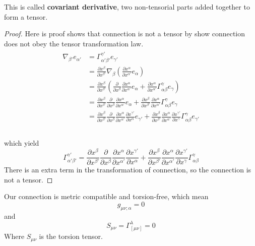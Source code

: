 \documentclass[12pt]{article}
\theoremstyle{mystyle}{\newtheorem{definition}{Definition}[subsection]}
\theoremstyle{mystyle}{\newtheorem{theorem}[definition]{Theorem}}
\theoremstyle{mystyle}{\newtheorem*{remark}{Remark}}
\theoremstyle{mystyle}{\newtheorem{example}{Example}[subsection]}
\theoremstyle{mystyle}{\newtheorem{examples}{Examples}[subsection]}
\theoremstyle{mystyle}{\newtheorem{cthm}{}[subsection]}
\begin{document}
This is called \textbf{covariant derivative}, two non-tensorial parts added together to form a tensor.

\begin{proof}
  Here is proof shows that connection is not a tensor by show connection does not obey the tensor transformation law.
  \begin{align*}
    \begin{split}
      \nabla_{\beta'}e_{\alpha'} & = \Gamma^{\gamma'}_{\alpha'\beta'}e_{\gamma'} \\
      &= \frac{\partial x^{\beta}}{\partial x^{\beta'}}\nabla_{\beta}(\frac{\partial x^{\alpha}}{\partial x^{\alpha'}}e_{\alpha})\\
      &= \frac{\partial x^{\beta}}{\partial x^{\beta'}}
      (\frac{\partial}{\partial x^{\beta}}\frac{\partial x^{\alpha}}{\partial x^{\alpha'}}e_{\alpha}
      + \frac{\partial x^{\alpha}}{\partial x^{\alpha'}} \Gamma ^{\gamma}_{\alpha\beta} e_{\gamma})\\
      &= \frac{\partial x^{\beta}}{\partial x^{\beta'}}
      \frac{\partial}{\partial x^{\beta}}\frac{\partial x^{\alpha}}{\partial x^{\alpha'}}e_{\alpha}
      + \frac{\partial x^{\beta}}{\partial x^{\beta'}}
      \frac{\partial x^{\alpha}}{\partial x^{\alpha'}} \Gamma ^{\gamma}_{\alpha\beta} e_{\gamma}\\
      &= \frac{\partial x^{\beta}}{\partial x^{\beta'}}
      \frac{\partial}{\partial x^{\beta}}\frac{\partial x^{\alpha}}{\partial x^{\alpha'}}\frac{\partial x^{\gamma'}}{\partial x^{\alpha}}e_{\gamma'}
      + \frac{\partial x^{\beta}}{\partial x^{\beta'}}
      \frac{\partial x^{\alpha}}{\partial x^{\alpha'}} \frac{\partial x^{\gamma'}}{\partial x^{\gamma}} \Gamma ^{\gamma}_{\alpha\beta}  e_{\gamma'}\\
    \end{split}
  \end{align*}
  \\
  which yield \[\Gamma^{\gamma'}_{\alpha'\beta'} = \frac{\partial x^{\beta}}{\partial x^{\beta'}}
    \frac{\partial}{\partial x^{\beta}}\frac{\partial x^{\alpha}}{\partial x^{\alpha'}}\frac{\partial x^{\gamma'}}{\partial x^{\alpha}}
    + \frac{\partial x^{\beta}}{\partial x^{\beta'}}
    \frac{\partial x^{\alpha}}{\partial x^{\alpha'}}
    \frac{\partial x^{\gamma'}}{\partial x^{\gamma}} \Gamma ^{\gamma}_{\alpha\beta}\]
  There is an extra term in the transformation of connection, so the connection is not a tensor.
\end{proof}
Our connection is metric compatible and torsion-free, which mean \[g_{\mu\nu;\alpha} = 0\] and\[S_{\mu\nu} = \Gamma_{[\mu\nu]}^{\lambda} = 0 \]
Where \(S_{\mu\nu}\) is the torsion tensor.
\end{document}
